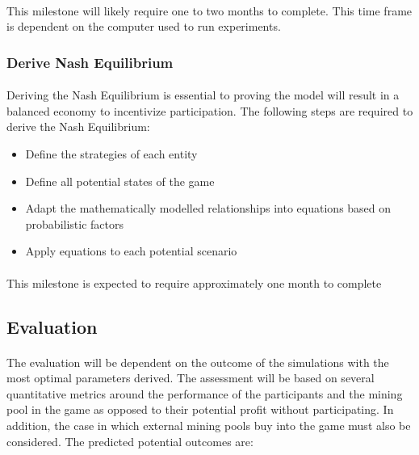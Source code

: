 \paragraph{} This milestone will likely require one to two months to complete. This time frame is dependent on the computer used to run experiments.

\subsubsection{Derive Nash Equilibrium}

\paragraph{} Deriving the Nash Equilibrium is essential to proving the model will result in a balanced economy to incentivize participation. The following steps are required to derive the Nash Equilibrium:

\begin{itemize}
  \item Define the strategies of each entity
  \item Define all potential states of the game
  \item Adapt the mathematically modelled relationships into equations based on probabilistic factors
  \item Apply equations to each potential scenario
\end{itemize}

\paragraph{} This milestone is expected to require approximately one month to complete

\subsection{Evaluation}

\paragraph{} The evaluation will be dependent on the outcome of the simulations with the most optimal parameters derived. The assessment will be based on several quantitative metrics around the performance of the participants and the mining pool in the game as opposed to their potential profit without participating. In addition, the case in which external mining pools buy into the game must also be considered. The predicted potential outcomes are:

